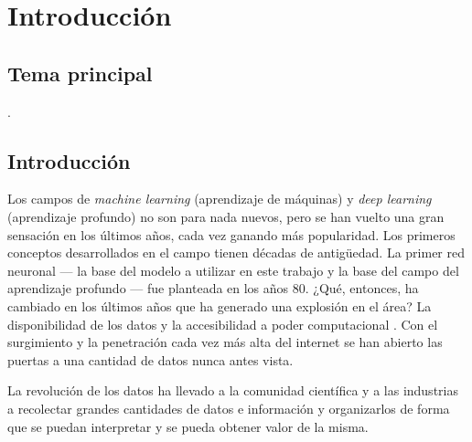 
\chapter{Introducción} %

\label{Chapter1} %


\newcommand{\keyword}[1]{\textbf{#1}}
\newcommand{\tabhead}[1]{\textbf{#1}}
\newcommand{\code}[1]{\texttt{#1}}
\newcommand{\file}[1]{\texttt{\bfseries#1}}
\newcommand{\option}[1]{\texttt{\itshape#1}}


\section{Tema principal}

\ttitle.



\section{Introducción}

Los campos de \emph{\gls{machine learning}} (aprendizaje de máquinas) y \emph{\gls{deep learning}} (\gls{aprendizaje profundo}) \parencite{lecun2015deep} no son para nada nuevos, pero se han vuelto una gran sensación en los últimos años, cada vez ganando más popularidad. Los primeros conceptos desarrollados en el campo tienen décadas de antigüedad. La primer \gls{red neuronal} --- la base del modelo a utilizar en este trabajo y la base del campo del aprendizaje profundo --- fue planteada en los años 80. ¿Qué, entonces, ha cambiado en los últimos años que ha generado una explosión en el área? La disponibilidad de los datos y la accesibilidad a poder computacional \parencite{jordan2015machine}. Con el surgimiento y la penetración cada vez más alta del internet se han abierto las puertas a una cantidad de datos nunca antes vista.

La revolución de los datos ha llevado a la comunidad científica y a las industrias a recolectar grandes cantidades de datos e información y organizarlos de forma que se puedan interpretar y se pueda obtener valor de la misma.

